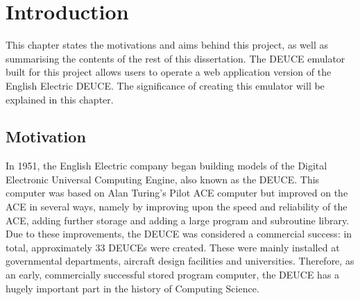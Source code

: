 \documentclass{l4proj}
\begin{document}
%
%
%
%
%
%
%
\chapter{Introduction}


This chapter states the motivations and aims behind this project, as well as summarising the
contents of the rest of this dissertation. The DEUCE emulator built for this project allows
users to operate a web application version of the English Electric DEUCE. The significance of creating
this emulator will be explained in this chapter.

\section{Motivation}

In 1951, the English Electric company began building models of the Digital Electronic Universal Computing Engine, also known as the DEUCE. This computer was based on Alan Turing's Pilot ACE computer but improved on the ACE in several ways, namely by improving upon the speed and reliability of the ACE, adding further storage and adding a large program and subroutine library. Due to these improvements, the DEUCE was considered a commercial success: in total, approximately 33 DEUCEs were created. These were mainly installed at governmental departments, aircraft design facilities and universities. Therefore, as an early, commercially successful stored program computer, the DEUCE has a hugely important part in the history of Computing Science.
\end{document}
